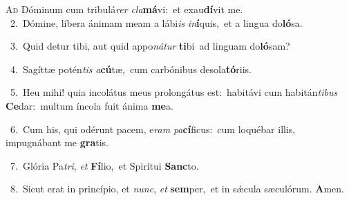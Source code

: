 \lettrine{\initial\textcolor{\initialcolor}{A}}{d} Dóminum cum tribulá\textit{rer} \textit{cla}\-\textbf{má}vi:~\star et exau\-\textbf{dí}\-vit me.\\
{\numbfont\textcolor{\numbcolor}{~2.}}~Dómine, líbera ánimam meam a lábi\textit{is} \textit{in}\-\textbf{í}quis,~\star et a lingua do\-\textbf{ló}\-sa.\par
{\numbfont\textcolor{\numbcolor}{~3.}}~Quid detur tibi, aut quid appo\-\textit{ná}\-\textit{tur} \textbf{ti}\-bi~\star ad linguam do\-\textbf{ló}\-sam?\par
{\numbfont\textcolor{\numbcolor}{~4.}}~Sagíttæ potén\textit{tis} \textit{a}\-\textbf{cú}tæ,~\star cum carbónibus desola\-\textbf{tó}\-riis.\par
{\numbfont\textcolor{\numbcolor}{~5.}}~Heu mihi! quia incolátus meus prolongátus est:~\dagger habitávi cum habitán\-\textit{ti}\-\textit{bus} \textbf{Ce}\-dar:~\star multum íncola fuit ánima \textbf{me}\-a.\par
{\numbfont\textcolor{\numbcolor}{~6.}}~Cum his, qui odérunt pacem, e\textit{ram} \textit{pa}\-\textbf{cí}ficus:~\star cum loquébar illis, impugnábant me \textbf{gra}\-tis.\par
{\numbfont\textcolor{\numbcolor}{~7.}}~Glória Pa\-\textit{tri}\-, \textit{et} \textbf{Fí}\-lio,~\star et Spirítui \textbf{Sanc}\-to.\par
{\numbfont\textcolor{\numbcolor}{~8.}}~Sicut erat in princípio, et \textit{nunc}\-, \textit{et} \textbf{sem}\-per,~\star et in sǽcula sæculórum. \textbf{A}\-men.\par
